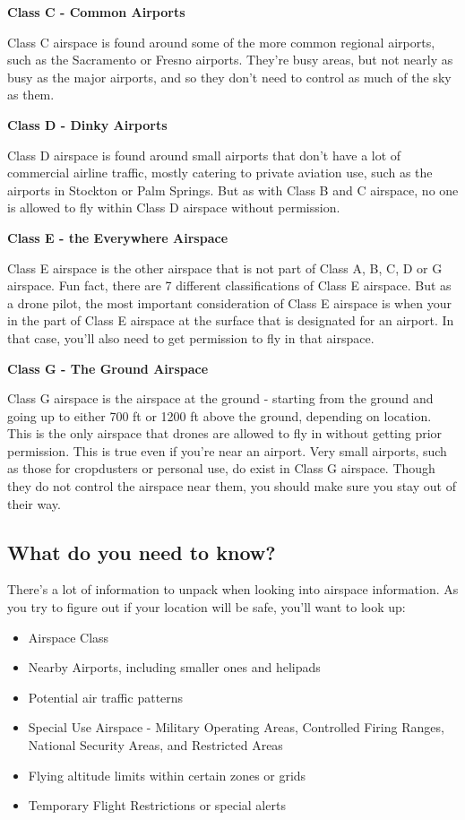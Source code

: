 \documentclass[
  12pt,
]{book}
\providecommand{\tightlist}{%
  \setlength{\itemsep}{0pt}\setlength{\parskip}{0pt}}
\begin{document}
\textbf{Class C - Common Airports}

Class C airspace is found around some of the more common regional airports, such as the Sacramento or Fresno airports. They're busy areas, but not nearly as busy as the major airports, and so they don't need to control as much of the sky as them.

\textbf{Class D - Dinky Airports}

Class D airspace is found around small airports that don't have a lot of commercial airline traffic, mostly catering to private aviation use, such as the airports in Stockton or Palm Springs. But as with Class B and C airspace, no one is allowed to fly within Class D airspace without permission.

\textbf{Class E - the Everywhere Airspace}

Class E airspace is the other airspace that is not part of Class A, B, C, D or G airspace. Fun fact, there are 7 different classifications of Class E airspace. But as a drone pilot, the most important consideration of Class E airspace is when your in the part of Class E airspace at the surface that is designated for an airport. In that case, you'll also need to get permission to fly in that airspace.

\textbf{Class G - The Ground Airspace}

Class G airspace is the airspace at the ground - starting from the ground and going up to either 700 ft or 1200 ft above the ground, depending on location. This is the only airspace that drones are allowed to fly in without getting prior permission. This is true even if you're near an airport. Very small airports, such as those for cropdusters or personal use, do exist in Class G airspace. Though they do not control the airspace near them, you should make sure you stay out of their way.

\subsection{What do you need to know?}\label{what-do-you-need-to-know}

There's a lot of information to unpack when looking into airspace information. As you try to figure out if your location will be safe, you'll want to look up:

\begin{itemize}
\tightlist
\item
  Airspace Class
\item
  Nearby Airports, including smaller ones and helipads
\item
  Potential air traffic patterns
\item
  Special Use Airspace - Military Operating Areas, Controlled Firing Ranges, National Security Areas, and Restricted Areas
\item
  Flying altitude limits within certain zones or grids
\item
  Temporary Flight Restrictions or special alerts
\end{itemize}
\end{document}
